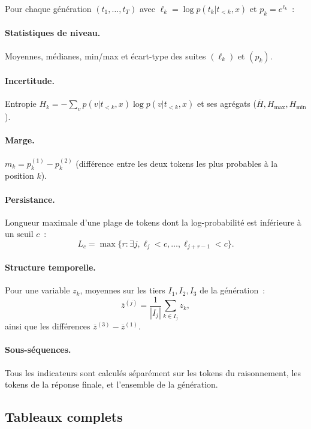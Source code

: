 \documentclass[12pt,a4paper]{article}
\begin{document}
Pour chaque génération $(t_1, \ldots, t_T)$ avec $\ell_k = \log p(t_k|t_{<k},x)$ et $p_k = e^{\ell_k}$~:

\paragraph{Statistiques de niveau.} Moyennes, médianes, min/max et écart-type des suites $(\ell_k)$ et $(p_k)$.

\paragraph{Incertitude.} Entropie $H_k = -\sum_v p(v|t_{<k},x)\log p(v|t_{<k},x)$ et ses agrégats ($\overline{H}, H_{\max}, H_{\min}$).

\paragraph{Marge.} $m_k = p_k^{(1)} - p_k^{(2)}$ (différence entre les deux tokens les plus probables à la position $k$).

\paragraph{Persistance.} Longueur maximale d'une plage de tokens dont la log-probabilité est inférieure à un seuil $c$~:
\[
L_c = \max\{r : \exists j, \ell_j < c, \ldots, \ell_{j+r-1} < c\}.
\]

\paragraph{Structure temporelle.} Pour une variable $z_k$, moyennes sur les tiers $I_1, I_2, I_3$ de la génération~:
\[
\overline{z}^{(j)} = \frac{1}{|I_j|}\sum_{k \in I_j} z_k,
\]
ainsi que les différences $\overline{z}^{(3)} - \overline{z}^{(1)}$.

\paragraph{Sous-séquences.} Tous les indicateurs sont calculés séparément sur les tokens du raisonnement, les tokens de la réponse finale, et l'ensemble de la génération.

\subsection{Tableaux complets}
\label{ann:tables_gsm}

{\small

}
\end{document}
